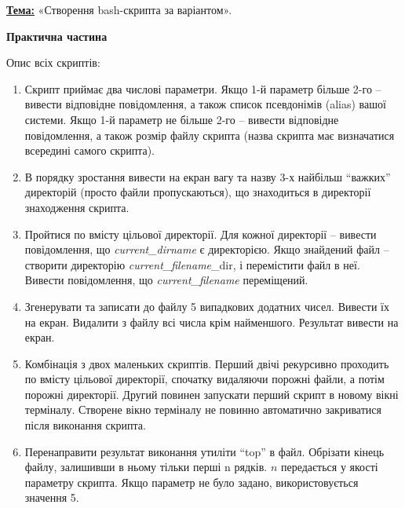 \documentclass[a4paper,12pt]{article}
\begin{document}

    \setlength{\parindent}{0em}

    \textbf{\underline{Тема:}} «Створення bash-скрипта за варіантом».
    
    \vspace{1em}

    \begin{center} \textbf{\Large Практична частина} \end{center}

    Опис всіх скриптів:

    \begin{enumerate}[label=\arabic*., start=0, itemsep=0.6em, leftmargin=*, align=left]

\item Скрипт приймає два числові параметри.
Якщо 1-й параметр більше 2-го -- вивести відповідне повідомлення, а
також список псевдонімів (alias) вашої системи.
Якщо 1-й параметр не більше 2-го -- вивести відповідне
повідомлення, а також розмір файлу скрипта (назва скрипта має
визначатися всередині самого скрипта).

\item В порядку зростання вивести на екран вагу та назву 3-х найбільш
“важких” директорій (просто файли пропускаються), що знаходиться
в директорії знаходження скрипта.

\item Пройтися по вмісту цільової директорії.
Для кожної директорії -- вивести повідомлення, що \emph{current\_dirname}
є директорією.
Якщо знайдений файл -- створити директорію \emph{current\_filename}\_dir,
і перемістити файл в неї. Вивести повідомлення, що
\emph{current\_filename} переміщений.

\item Згенерувати та записати до файлу 5 випадкових додатних чисел.
Вивести їх на екран. Видалити з файлу всі числа крім найменшого.
Результат вивести на екран.

\item Комбінація з двох маленьких скриптів.
Перший двічі рекурсивно проходить по вмісту цільової директорії,
спочатку видаляючи порожні файли, а потім порожні директорії.
Другий повинен запускати перший скрипт в новому вікні терміналу.
Створене вікно терміналу не повинно автоматично закриватися після
виконання скрипта.

\item Перенаправити результат виконання утиліти “top” в файл.
Обрізати кінець файлу, залишивши в ньому тільки перші n рядків. $n$
передається у якості параметру скрипта. Якщо параметр не було
задано, використовується значення 5.

\end{enumerate}
\end{document}
